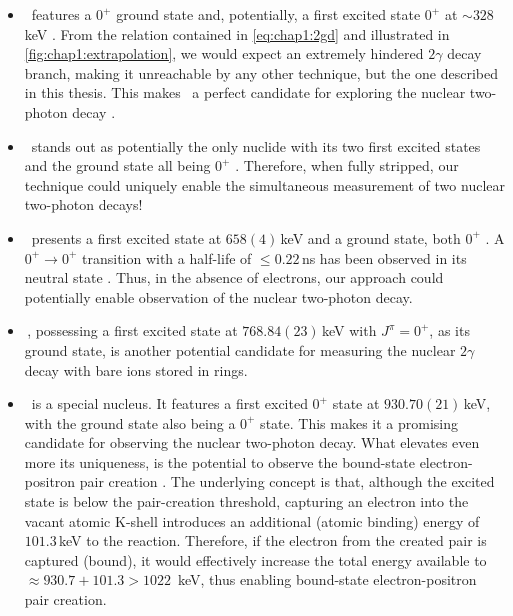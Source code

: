 \begin{itemize}
    \item \, features a $0^+$ ground state and, potentially, a first excited state $0^+$ at $\sim328$\,keV \cite{A182}. From the relation contained in \cref{eq:chap1:2gd} and illustrated in \cref{fig:chap1:extrapolation}, we would expect an extremely hindered $2\gamma$ decay branch, making it unreachable by any other technique, but the one described in this thesis. This makes \, a perfect candidate for exploring the nuclear two-photon decay \cite{A182}.
    \item \, stands out as potentially the only nuclide with its two first excited states and the ground state all being $0^+$ \cite{A186}. Therefore, when fully stripped, our technique could uniquely enable the simultaneous measurement of two nuclear two-photon decays!
    \item \, presents a first excited state at $658(4)$\,keV and a ground state, both $0^+$ \cite{A190}. A $0^+\rightarrow0^+$ transition with a half-life of $\leq 0.22$\,ns has been observed in its neutral state \cite{A190}. Thus, in the absence of electrons, our approach could potentially enable observation of the nuclear two-photon decay.
    \item \,, possessing a first excited state at $768.84(23)$\,keV \cite{A192} with $J^\pi=0^+$, as its ground state, is another potential candidate for measuring the nuclear $2\gamma$ decay with bare ions stored in rings.
    \item \, is a special nucleus. It features a first excited $0^+$ state at $930.70(21)$\,keV, with the ground state also being a $0^+$ state. This makes it a promising candidate for observing the nuclear two-photon decay. What elevates even more its uniqueness, is the potential to observe the bound-state electron-positron pair creation \cite{boundelectronpositron}. The underlying concept is that, although the excited state is below the pair-creation threshold, capturing an electron into the vacant atomic K-shell introduces an additional (atomic binding) energy of $101.3$\,keV to the reaction. Therefore, if the electron from the created pair is captured (bound), it would effectively increase the total energy available to $\approx 930.7 + 101.3 > 1022$~keV, thus enabling bound-state electron-positron pair creation.
\end{itemize}

